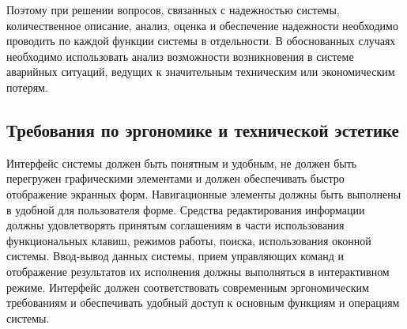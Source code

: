 Поэтому при решении вопросов, связанных с надежностью системы, количественное
описание, анализ, оценка и обеспечение надежности необходимо проводить по каждой
функции системы в отдельности. В обоснованных случаях необходимо использовать
анализ возможности возникновения в системе аварийных ситуаций, ведущих к
значительным техническим или экономическим потерям.

\subsection{Требования по эргономике и технической эстетике}
Интерфейс системы должен быть понятным и удобным, не должен быть перегружен
графическими элементами и должен обеспечивать быстро отображение экранных форм.
Навигационные элементы должны быть выполнены в удобной для пользователя форме.
Средства редактирования информации должны удовлетворять принятым соглашениям в
части использования функциональных клавиш, режимов работы, поиска, использования
оконной системы. Ввод-вывод данных системы, прием управляющих команд и
отображение результатов их исполнения должны выполняться в интерактивном режиме.
Интерфейс должен соответствовать современным эргономическим требованиям и
обеспечивать удобный доступ к основным функциям и операциям системы.
